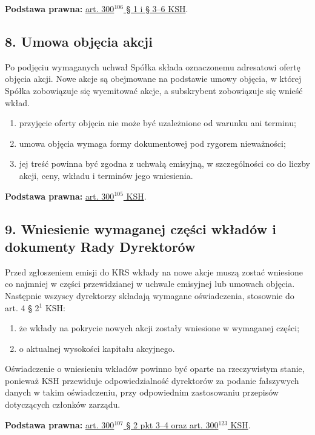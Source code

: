 \documentclass[12pt,a4paper]{report}
\begin{document}
\textbf{Podstawa prawna:} \href{https://eli.gov.pl/api/acts/DU/2024/18/text.html}{art. 300$^{106}$ § 1 i § 3--6 KSH}.

\subsection*{8. Umowa objęcia akcji}

Po podjęciu wymaganych uchwał Spółka składa oznaczonemu adresatowi ofertę objęcia akcji. Nowe akcje są obejmowane na podstawie umowy objęcia, w której Spółka zobowiązuje się wyemitować akcje, a subskrybent zobowiązuje się wnieść wkład.

\begin{enumerate}
  \item przyjęcie oferty objęcia nie może być uzależnione od warunku ani terminu;
  \item umowa objęcia wymaga formy dokumentowej pod rygorem nieważności;
  \item jej treść powinna być zgodna z uchwałą emisyjną, w szczególności co do liczby akcji, ceny, wkładu i terminów jego wniesienia.
\end{enumerate}

\textbf{Podstawa prawna:} \href{https://eli.gov.pl/api/acts/DU/2024/18/text.html}{art. 300$^{105}$ KSH}.

\subsection*{9. Wniesienie wymaganej części wkładów i dokumenty Rady Dyrektorów}

Przed zgłoszeniem emisji do KRS wkłady na nowe akcje muszą zostać wniesione co najmniej w części przewidzianej w uchwale emisyjnej lub umowach objęcia. Następnie wszyscy dyrektorzy składają wymagane oświadczenia, stosownie do art. 4 § 2$^{1}$ KSH:
\begin{enumerate}
  \item że wkłady na pokrycie nowych akcji zostały wniesione w wymaganej części;
  \item o aktualnej wysokości kapitału akcyjnego.
\end{enumerate}

Oświadczenie o wniesieniu wkładów powinno być oparte na rzeczywistym stanie, ponieważ KSH przewiduje odpowiedzialność dyrektorów za podanie fałszywych danych w takim oświadczeniu, przy odpowiednim zastosowaniu przepisów dotyczących członków zarządu.

\textbf{Podstawa prawna:} \href{https://eli.gov.pl/api/acts/DU/2024/18/text.html}{art. 300$^{107}$ § 2 pkt 3--4 oraz art. 300$^{123}$ KSH}.
\end{document}
